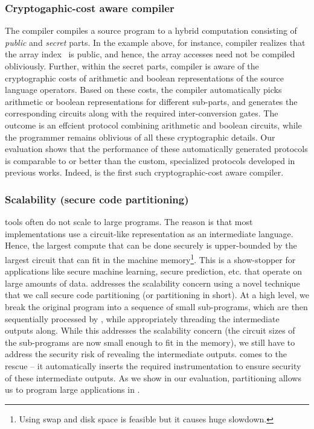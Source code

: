 \subsubsection*{Cryptogaphic-cost aware compiler} The \tool compiler
compiles a source program to a hybrid computation consisting
of \emph{public} and \emph{secret} parts. In the example above, for
instance, \tool compiler realizes that the array index~ is
public, and hence, the array accesses need not be compiled
obliviously. Further, within the secret parts, \tool compiler is
aware
of the cryptographic costs of arithmetic and boolean representations
of the source language operators. Based on these costs, the compiler
automatically picks arithmetic or boolean
representations for different sub-parts, and generates the
corresponding circuits along with the required inter-conversion
gates. The outcome is an effcient \mpc protocol combining arithmetic
and boolean circuits, while the programmer remains
oblivious of all these cryptographic details. Our evaluation
shows that the performance of these automatically generated protocols
is comparable
to or better than the custom, specialized protocols developed in previous works. Indeed, \tool is the first such cryptographic-cost
aware compiler.

\subsubsection*{Scalability (secure code partitioning)} \mpc tools
often do not scale to large programs. The reason is that
most \mpc implementations use a circuit-like representation as an
intermediate language. Hence, the largest compute that can be done
securely is upper-bounded by the largest circuit that can fit in the
machine memory\footnote{Using swap and
disk space is feasible but it causes huge slowdown.}. This is a
show-stopper for applications like secure machine learning, secure
prediction, etc. that operate on large amounts of data.
\tool addresses the scalability concern using a novel technique that
we call secure code partitioning (or partitioning in short). At
a high level, we break the original program into a sequence of small
sub-programs, which are then sequentially processed by \tool, while
appropriately threading the intermediate outputs
along. While this
addresses the scalability concern (the circuit
sizes of the sub-programs are now small enough to fit in the memory),
we still have to address
the security risk of revealing the intermediate outputs. \tool comes
to the rescue -- it automatically inserts the required instrumentation
to ensure security of these intermediate outputs. As
we show in our
evaluation, partitioning allows us to program large applications
in \tool.


